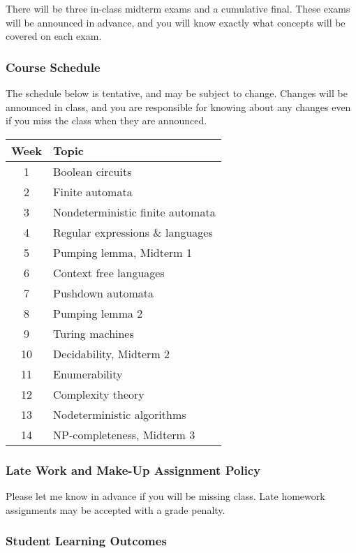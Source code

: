 \documentclass[10pt]{article}
\begin{document}
There will be three in-class midterm exams and a cumulative final. These exams will be announced in advance, and you will know exactly what concepts will be covered on each exam.

\subsubsection*{Course Schedule} 

The schedule below is tentative, and may be subject to change. Changes will be announced in class, and you are responsible for knowing about any changes even if you miss the class when they are announced.

\begin{center}
\begin{tabular}{|c|l|}
\hline
Week  & Topic \\ \hline
1  & Boolean circuits  \\
2  & Finite automata  \\
3  & Nondeterministic finite automata  \\
4  & Regular expressions \& languages  \\
5  & Pumping lemma, Midterm 1  \\
6  & Context free languages  \\
7  & Pushdown automata  \\
8  & Pumping lemma 2  \\
9  & Turing machines  \\
10  & Decidability, Midterm 2  \\
11  & Enumerability  \\
12  & Complexity theory  \\
13  & Nodeterministic algorithms  \\
14  & NP-completeness, Midterm 3  \\ \hline
\end{tabular}
\end{center}


\subsubsection*{Late Work and Make-Up Assignment Policy}

Please let me know in advance if you will be missing class. Late homework assignments may be accepted with a grade penalty. 


\subsubsection*{Student Learning Outcomes}
\end{document}
